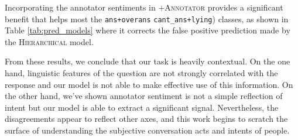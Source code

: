 Incorporating the annotator sentiments in \textsc{+Annotator} provides a significant benefit that helps most the \texttt{ans+overans}  \texttt{cant\_ans+lying}) classes, as shown in Table \ref{tab:pred_models} where it corrects the false positive prediction made by the \textsc{Hierarchical} model.

From these results, we conclude that our task is heavily contextual. On the one hand, linguistic features of the question are not strongly correlated with the response and our model is not able to make effective use of this information. On the other hand, we've shown annotator sentiment is not a simple reflection of intent but our model is able to extract a significant signal. Nevertheless, the disagreements appear to reflect other axes, and this work begins to scratch the surface of understanding the subjective conversation acts and intents of people.

